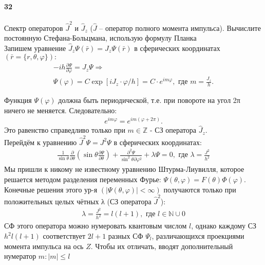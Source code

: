 


	\paragraph{32}
	Спектр операторов $\hat{J}^2$ и $\hat{J}_z$ ($\hat{J}$ -- оператор полного момента импульса). Вычислите постоянную Стефана-Больцмана, использую формулу Планка\\
	
	Запишем уравнение $\hat{J}_z\Psi(\bar r)=J_z\Psi(\bar{r})$ в сферических координатах $\left(\bar{r}=\{r,\theta,\varphi\}\right):$
	\begin{gather*}
	-ih\frac{\partial\Psi}{\partial\varphi}=J_z\Psi\Rightarrow\\
	\Psi(\varphi)=C\exp\left[iJ_z\cdot \varphi/h\right]=C\cdot e^{im\varphi},\text{ где } m=\frac{J_z}{h}.
	\end{gather*}	

	Функция $\Psi(\varphi)$ должна быть периодической, т.е. при повороте на угол 2π ничего не меняется. Следовательно:
	\begin{gather*}
	e^{im\varphi}=e^{im(\varphi+2π)}.
	\end{gather*}
	Это равенство справедливо только при $m\in\mathbb Z$ - СЗ оператора $\hat{J}_z.$\\
	
	Перейдём к уравнению $\hat{J}^2\Psi=J^2\Psi$ в сферических координатах:
	\begin{gather*}
	\frac{1}{\sin\theta}\frac{\partial}{\partial\theta}\left(\sin\theta\frac{\partial\Psi}{\partial\theta}\right)+\frac{\partial^2\Psi}{\sin^2\theta\partial\varphi^2}+\lambda\Psi=0,\text{ где }\lambda=\frac{J^2}{h^2}
	\end{gather*}
	Мы пришли к никому не известному уравнению Штурма-Лиувилля, которое решается методом разделения переменных Фурье: $\Psi\left(\theta,\varphi\right)=F(\theta)\Phi(\varphi).$ Конечные решения этого ур-я $\left(\vert\Psi(\theta,\varphi)\vert<\infty\right)$ получаются только при положительных целых чётных λ (СЗ оператора $\hat{J}^2$):
	\begin{gather*}
	\lambda=\frac{J^2}{h^2}=l(l+1),\text{ где }l\in\mathbb{N}\cup0
	\end{gather*}
	СФ этого оператора можно нумеровать квантовым числом $l$, однако каждому СЗ $h^2l(l+1)$ соответствует $2l+1$ разных СФ $\Psi_l$, различающихся проекциями момента импульса на ось $Z.$ Чтобы их отличать, вводят дополнительный нумератор $m : \vert m\vert\le l$
	
